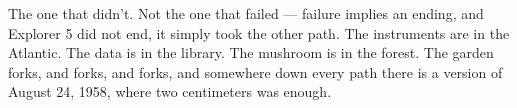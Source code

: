 \documentclass[12pt, letterpaper]{article}
\begin{document}
The one that didn't. Not the one that failed --- failure implies an ending, and Explorer 5 did not end, it simply took the other path. The instruments are in the Atlantic. The data is in the library. The mushroom is in the forest. The garden forks, and forks, and forks, and somewhere down every path there is a version of August 24, 1958, where two centimeters was enough.
\end{document}
